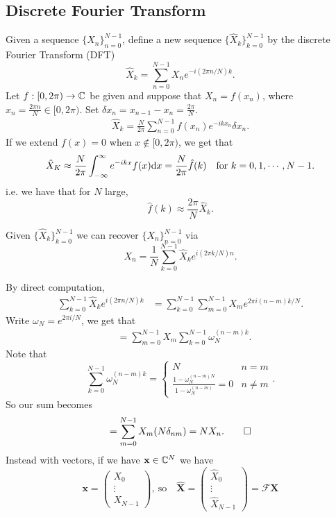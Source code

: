 \documentclass{article}
\begin{document}
\subsection{Discrete Fourier Transform}
Given a sequence $ \{X_n\}_{n=0}^{N-1} $, define a new sequence $ \{\hat X_{k}\}_{k=0}^{N-1} $ by the discrete Fourier Transform (DFT)
\[
	\hat X_k=\sum_{n=0}^{N-1}X_ne^{-i(2\pi n/N)k}.
\]
Let $ f:[0,2\pi)\to \mathbb{C} $ be given and suppose that $ X_n=f(x_n) $, where $ x_n=\frac{2\pi n}N \in [0,2\pi) $. Set $ \delta x_n=x_{n-1}-x_n=\frac {2\pi}N $.
\begin{align*}
	\hat X_k=\frac N{2\pi}\sum_{n=0}^{N-1}f(x_n)e^{-ikx_n}\delta x_n.
\end{align*}
If we extend $ f(x)=0 $ when $ x\notin [0,2\pi) $, we get that
\[
	\hat X_K\approx \frac {N}{2\pi} \allint e^{-ikx}f(x)\mathrm dx=\frac N{2\pi}\hat f(k)\quad \text{for}\ k=0,1,\cdots,N-1.
\]
i.e. we have that for $ N $ large,
\[
	\hat f(k)\approx \frac{2\pi}N\hat X_k.
\]
\begin{proposition}
	Given $ \{\hat X_k\}_{k=0}^{N-1} $ we can recover $ \{X_n\}_{n=0}^{N-1} $ via 
	\[
		X_n=\frac 1N\sum_{k=0}^{N-1}\hat X_ke^{i(2\pi k/N)n}.
	\]
\end{proposition}
\pf By direct computation,
\begin{align*}
	\sum_{k=0}^{N-1}\hat X_ke^{i(2\pi n/N)k} &= \sum_{k=0}^{N-1}\sum_{m=0}^{N-1} X_me^{2\pi i(n-m)k/N}.
\end{align*}
Write $ \omega_N=e^{2\pi i/N} $, we get that
\begin{align*}
  &=\sum_{m=0}^{N-1}X_m\sum_{k=0}^{N-1}\omega_N^{(n-m)k}.
\end{align*}
Note that
\[
	\sum_{k=0}^{N-1}\omega_N^{(n-m)k}=\begin{cases}
		N & n=m \\
		\frac{1-\omega_N^{(n-m)N}}{1-\omega_N^{(n-m)}}=0 & n\ne m
	\end{cases}.
\]
So our sum becomes
\[
	=\sum_{m=0}^{N-1}X_m(N\delta_{nm})=NX_n.\qed
\]
Instead with vectors, if we have $ \mathbf x\in \mathbb{C}^N $ we have
\[
  \mathbf x=\begin{pmatrix}
	  X_0 \\ \vdots \\ X_{N-1}
  \end{pmatrix},\ \text{so}\quad \hat {\mathbf X}=\begin{pmatrix}
  \hat X_0 \\ \vdots \\ \hat X_{N-1}
  \end{pmatrix} = \mathcal F\mathbf X
\]
\end{document}
